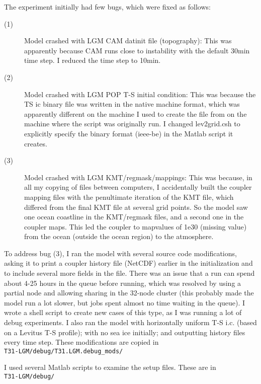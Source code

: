 \documentclass[authoryear,round,12pt]{article}
\begin{document}
The experiment initially had few bugs, which were fixed as follows:
\begin{description}

\item[(1)] Model crashed with LGM CAM datinit file (topography): This
  was apparently because CAM runs close to instability with the
  default 30min time step. I reduced the time step to 10min.

\item[(2)] Model crashed with LGM POP T-S initial condition: This was
  because the TS ic binary file was written in the native machine
  format, which was apparently different on the machine I used to
  create the file from on the machine where the script was originally
  run. I changed lev2grid.csh to explicitly specify the binary format
  (ieee-be) in the Matlab script it creates.

\item[(3)] Model crashed with LGM KMT/regmask/mappings: This was
  because, in all my copying of files between computers, I
  accidentally built the coupler mapping files with the penultimate
  iteration of the KMT file, which differed from the final KMT file at
  several grid points. So the model saw one ocean coastline in the
  KMT/regmask files, and a second one in the coupler maps. This led
  the coupler to mapvalues of 1e30 (missing value) from the ocean
  (outside the ocean region) to the atmosphere.

\end{description}

To address bug (3), I ran the model with several source code
modifications, asking it to print a coupler history file (NetCDF)
earlier in the initialization and to include several more fields in
the file. There was an issue that a run can spend about 4-25 hours in
the queue before running, which was resolved by using a partial node
and allowing sharing in the 32-node cluster (this probably made the
model run a lot slower, but jobs spent almost no time waiting in the
queue). I wrote a shell script to create new cases of this type, as I
was running a lot of debug experiments. I also ran the model with
horizontally uniform T-S i.c. (based on a Levitus T-S profile); with
no sea ice initially; and outputting history files every time
step. These modifications are copied in\\
\verb+T31-LGM/debug/T31.LGM.debug_mods/+

I used several Matlab scripts to examine the setup files. These are in\\ 
\verb+T31-LGM/debug/+




\end{document}
